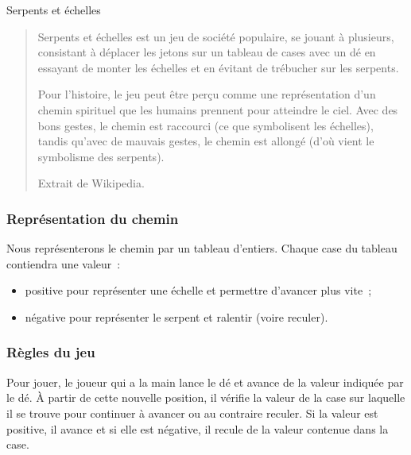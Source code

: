 		\begin{Exercice}{Serpents et échelles}

			\begin{quote}
		
				Serpents et échelles est un jeu de société populaire, se jouant
				à plusieurs, consistant à déplacer les jetons sur un tableau de
				cases avec un dé en essayant de monter les échelles et en
				évitant de trébucher sur les serpents.	
	
				Pour l’histoire, le jeu peut être perçu comme une
				représentation d’un chemin spirituel que les humains prennent
				pour atteindre le ciel. Avec des bons gestes, le chemin est
				raccourci (ce que symbolisent les échelles), tandis qu’avec de
				mauvais gestes, le chemin est allongé (d’où vient le symbolisme
				des serpents).  
		
			\begin{flushright} 
				Extrait de Wikipedia.		
			\end{flushright}
			\end{quote}
		
		\subsubsection*{Représentation du chemin}
		
			Nous représenterons le chemin par un tableau d’entiers. 
			Chaque case du tableau contiendra une valeur~:
			\begin{itemize}
				
				\item positive pour représenter une échelle et permettre
					d’avancer plus vite~;
				
				\item négative pour représenter le serpent et ralentir (voire
					reculer).  
			\end{itemize}
	
		\subsubsection*{Règles du jeu}
		
			Pour jouer, le joueur qui a la main lance le dé et avance de la
			valeur indiquée par le dé. À partir de cette nouvelle position, il
			vérifie la valeur de la case sur laquelle il se trouve pour
			continuer à avancer ou au contraire reculer. Si la valeur est
			positive, il avance et si elle est négative, il recule de la valeur
			contenue dans la case.
		

\end{Exercice}

